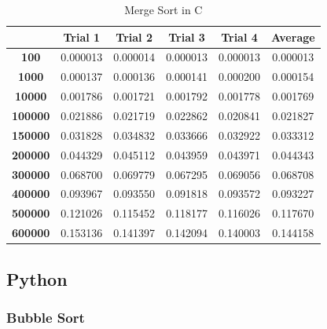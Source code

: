 \documentclass[]{report}
\begin{document}
				\begin{table}[H]  
  				  \centering
  				  \caption{Merge Sort in C}
		 		  \begin{tabular}{cccccc}
		 		    \toprule
		 		         & \textbf{Trial 1} & \textbf{Trial 2} & \textbf{Trial 3} & \textbf{Trial 4} & \textbf{Average} \\ \midrule
		 		    \textbf{100} 	& 0.000013 & 0.000014 & 0.000013 & 0.000013 & 0.000013   \\
		 		    \textbf{1000} 	& 0.000137 & 0.000136 & 0.000141 & 0.000200 & 0.000154   \\
		 		    \textbf{10000} 	& 0.001786 & 0.001721 & 0.001792 & 0.001778 & 0.001769   \\
		 		    \textbf{100000} & 0.021886 & 0.021719 & 0.022862 & 0.020841 & 0.021827   \\
		 		    \textbf{150000} & 0.031828 & 0.034832 & 0.033666 & 0.032922 & 0.033312   \\
		 		    \textbf{200000} & 0.044329 & 0.045112 & 0.043959 & 0.043971 & 0.044343   \\
		 		    \textbf{300000} & 0.068700 & 0.069779 & 0.067295 & 0.069056 & 0.068708   \\
		 		    \textbf{400000} & 0.093967 & 0.093550 & 0.091818 & 0.093572 & 0.093227   \\
		 		    \textbf{500000} & 0.121026 & 0.115452 & 0.118177 & 0.116026 & 0.117670   \\
		 		    \textbf{600000} & 0.153136 & 0.141397 & 0.142094 & 0.140003 & 0.144158   \\ \bottomrule
		 		  \end{tabular}
		 		\end{table}
		 		
		 			
		 	\subsection{Python}
		 		\subsubsection{Bubble Sort}
		 		
\end{document}
